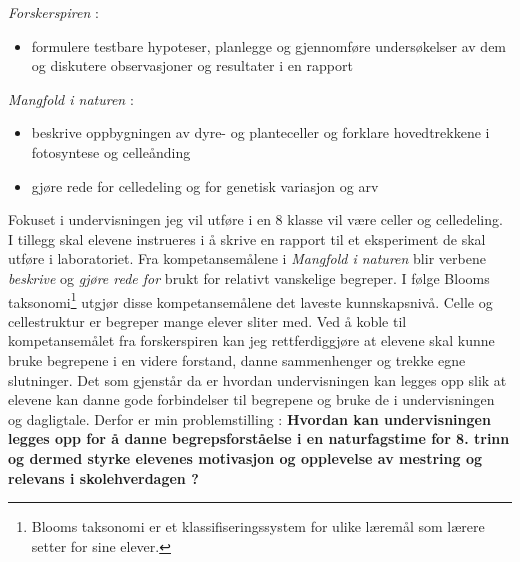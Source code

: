 \documentclass[main.tex]{subfiles}
\begin{document}
\begin{displayquote}
\emph{Forskerspiren} :
\begin{itemize}
\vspace{-2mm}
\item formulere testbare hypoteser, planlegge og gjennomføre undersøkelser 
av dem og diskutere observasjoner og resultater i en rapport
\end{itemize}
\emph{Mangfold i naturen} :
\begin{itemize}
\vspace{-2mm}
\item beskrive oppbygningen av dyre- og planteceller og forklare hovedtrekkene i fotosyntese 
og celleånding
\vspace{-3mm}
\item gjøre rede for celledeling og for genetisk variasjon og arv
\end{itemize}
\end{displayquote}
Fokuset i undervisningen jeg vil utføre i en 8 klasse vil være celler og celledeling. 
I tillegg skal elevene instrueres i å skrive en rapport til et eksperiment de skal utføre i laboratoriet. 
Fra kompetansemålene i \emph{Mangfold i naturen} blir verbene \emph{beskrive} og \emph{gjøre rede for} brukt 
for relativt vanskelige begreper. I følge Blooms taksonomi\footnote{Blooms taksonomi er et klassifiseringssystem 
for ulike læremål som lærere setter for sine elever.} utgjør disse kompetansemålene det laveste 
kunnskapsnivå. Celle og cellestruktur er begreper mange elever sliter med. Ved å koble til kompetansemålet 
fra forskerspiren kan jeg rettferdiggjøre at elevene skal kunne bruke begrepene i en videre forstand, danne 
sammenhenger og trekke egne slutninger. Det som gjenstår da er hvordan undervisningen kan legges opp slik at elevene 
kan danne gode forbindelser til begrepene og bruke de i undervisningen og dagligtale.
\newline
\newline
Derfor er min problemstilling :
\newline
\newline
\textbf{Hvordan kan undervisningen legges opp for å danne begrepsforståelse i en naturfagstime for 8. trinn 
og dermed styrke elevenes motivasjon og opplevelse av mestring og relevans i skolehverdagen ?}
\end{document}
